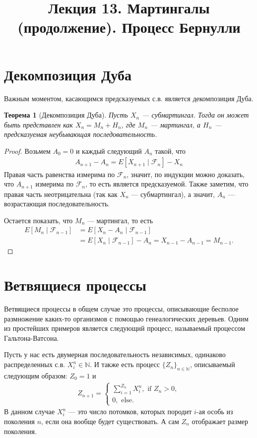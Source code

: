 \documentclass[12pt]{article}
\title{Лекция 13. Мартингалы (продолжение). Процесс Бернулли}
\newcommand\N{\mathbb{N}}
\newcommand\F{\mathcal{F}}
\newtheorem{theorem}{Теорема}
\begin{document}
\maketitle

\section{Декомпозиция Дуба}

Важным моментом, касающимся предсказуемых с.в. является декомпозиция Дуба.
\begin{theorem}[Декомпозиция Дуба]
  Пусть $X_n$ --- субмартингал. Тогда он может быть представлен как $X_n = M_n + H_n$, где $M_n$ --- мартингал, а $H_n$ --- предсказуемая неубывающая последовательность.
\end{theorem} 
\begin{proof}
  Возьмем $A_0 = 0$ и каждый следующий $A_n$ такой, что
  \begin{align*}
    A_{n + 1} - A_n = E[X_{n + 1} \mid \F_n] - X_n
  \end{align*}
  Правая часть равенства измерима по $\F_n$, значит, по индукции можно доказать, что $A_{n + 1}$ измерима по $\F_n$, то есть является предсказуемой. Также заметим, что правая часть неотрицательна (так как $X_n$ --- субмартингал), а значит, $A_n$ --- возрастающая последовательность.

  Остается показать, что $M_n$ --- мартингал, то есть
  \begin{align*}
    E[M_n \mid \F_{n - 1}] &= E[X_n - A_n \mid \F_{n - 1}] \\
    &= E[X_n \mid \F_{n -1}] - A_n = X_{n - 1} - A_{n - 1} = M_{n - 1}.
  \end{align*}
\end{proof}

\section{Ветвящиеся процессы}

Ветвящиеся процессы в общем случае это процессы, описывающие бесполое размножение каких-то организмов с помощью генеалогических деревьев. Одним из простейших примеров является следующий процесс, называемый процессом Гальтона-Ватсона.

Пусть у нас есть двумерная последовательность независимых, одинаково распределенных с.в. $X_i^n \in \N$. И также есть процесс $\{Z_n\}_{n \in \N}$, описываемый следующим образом: $Z_0 = 1$ и
\begin{align*}
  Z_{n + 1} = \begin{cases}
    \sum_{i = 1}^{Z_n} X_i^n, \text{ if } Z_n > 0,\\
    0, \text{ else}. 
  \end{cases}
\end{align*}
В данном случае $X_i^n$ --- это число потомков, которых породит $i$-ая особь из поколения $n$, если она вообще будет существовать. А сам $Z_n$ отображает размер поколения.
\end{document}

